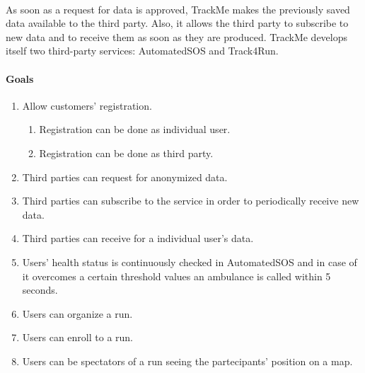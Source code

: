 \documentclass[a4paper]{article}
\begin{document}
\paragraph{}
As soon as a request for data is approved, TrackMe makes the previously saved data available to the 
third party. Also, it allows the third party to subscribe to new data and to receive them as soon as 
they are produced.
TrackMe develops itself two third-party services: AutomatedSOS and Track4Run.

\paragraph{Goals}

\begin{enumerate}[label*={G.\arabic*}]
    
    
    \item Allow customers' registration.
    \begin{enumerate}[label*=.\arabic*]
        \item Registration can be done as individual user.
        \item Registration can be done as third party.
    \end{enumerate}
    
    \item Third parties can request for anonymized data.

    \item Third parties can subscribe to the service in order to periodically receive new data.
        
    \item Third parties can receive for a individual user's data.
    
    \item Users' health status is continuously checked in AutomatedSOS and in case of it overcomes a certain threshold values an ambulance is called within 5 seconds.
    
    \item Users can organize a run.
    \item Users can enroll to a run.
    \item Users can be spectators of a run seeing the partecipants' position on a map.
    
\end{enumerate}

\clearpage
\end{document}
